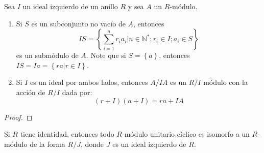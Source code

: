 \documentclass[12pt]{report}
\newcounter{it}
\theoremstyle{largebreak}
\begin{document}
    \begin{excer}
        Sea $I$ un ideal izquierdo de un anillo $R$ y sea $A$ un $R$-módulo.
        \begin{enumerate}[label = \textit{(\alph*)}]
            \item Si $S$ es un subconjunto no vacío de $A$, entonces
            \begin{equation*}
                IS=\left\{\sum_{ i=1}^n r_ia_i\Big|n\in\mathbb{N}^*;r_i\in I;a_i\in S \right\}
            \end{equation*}
            es un submódulo de $A$. Note que si $S=\left\{a \right\}$, entonces $IS=Ia=\left\{ra\Big|r\in I \right\}$.
            \item Si $I$ es un ideal por ambos lados, entonces $A/IA$ es un $R/I$ módulo con la acción de $R/I$ dada por:
            \begin{equation*}
                (r+I)(a+I)=ra+IA
            \end{equation*}
        \end{enumerate}
    \end{excer}

    \begin{proof}
        
    \end{proof}

    \begin{excer}
        Si $R$ tiene identidad, entonces todo $R$-módulo unitario cíclico es isomorfo a un $R$-módulo de la forma $R/J$, donde $J$ es un ideal izquierdo de $R$.
    \end{excer}
\end{document}
